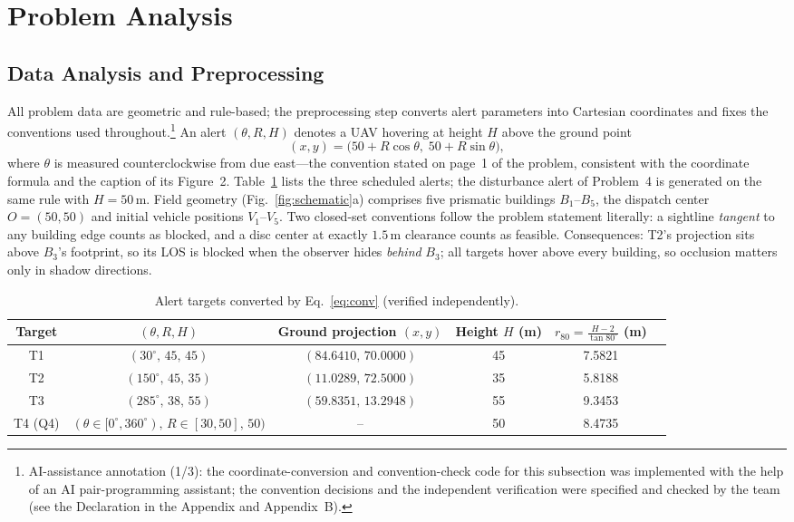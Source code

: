 \section{Problem Analysis}\label{sec:analysis}
\subsection{Data Analysis and Preprocessing}

All problem data are geometric and rule-based; the preprocessing step converts alert
parameters into Cartesian coordinates and fixes the conventions used
throughout.\footnote{AI-assistance annotation (1/3): the coordinate-conversion and
convention-check code for this subsection was implemented with the help of an AI
pair-programming assistant; the convention decisions and the independent verification
were specified and checked by the team (see the Declaration in the Appendix and
Appendix~B).}
An alert $(\theta,R,H)$ denotes a UAV hovering at height $H$ above the ground point
\begin{equation}\label{eq:conv}
(x,y)=\bigl(50+R\cos\theta,\;50+R\sin\theta\bigr),
\end{equation}
where $\theta$ is measured counterclockwise from due east---the convention stated on
page~1 of the problem, consistent with the coordinate formula and the caption of its
Figure~2. Table~\ref{tab:targets} lists the three scheduled alerts; the disturbance alert
of Problem~4 is generated on the same rule with $H=50\,\mathrm{m}$. Field geometry
(Fig.~\ref{fig:schematic}a) comprises five prismatic buildings $B_1$--$B_5$, the dispatch
center $O=(50,50)$ and initial vehicle positions $V_1$--$V_5$. Two closed-set conventions
follow the problem statement literally: a sightline \emph{tangent} to any building edge
counts as blocked, and a disc center at exactly $1.5\,\mathrm{m}$ clearance counts as
feasible. Consequences: T2's projection sits above $B_3$'s footprint, so its LOS is
blocked when the observer hides \emph{behind} $B_3$; all targets hover above every
building, so occlusion matters only in shadow directions.

\begin{table}[!htb]\centering\small
\setlength{\tabcolsep}{3pt}
\caption{Alert targets converted by Eq.~\eqref{eq:conv} (verified independently).}
\label{tab:targets}
\begin{tabular}{cccccc}
\toprule
Target & $(\theta,R,H)$ & Ground projection $(x,y)$ & Height $H$ (m) & $r_{80}=\frac{H-2}{\tan80^\circ}$ (m) \\
\midrule
T1 & $(30^\circ,\,45,\,45)$ & $(84.6410,\,70.0000)$ & 45 & 7.5821 \\
T2 & $(150^\circ,\,45,\,35)$ & $(11.0289,\,72.5000)$ & 35 & 5.8188 \\
T3 & $(285^\circ,\,38,\,55)$ & $(59.8351,\,13.2948)$ & 55 & 9.3453 \\
T4 (Q4) & $(\theta\in[0^\circ,360^\circ),\,R\in[30,50],\,50)$ & -- & 50 & 8.4735 \\
\bottomrule
\end{tabular}
\end{table}

